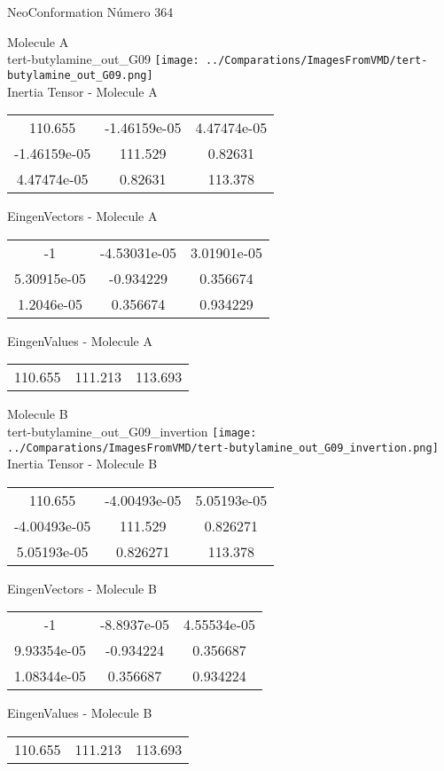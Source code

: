 \vtab[-2cm]
\begin{center}
{\large NeoConformation \tab Número 364}
\end{center}
\begin{multicols}{2}
\begin{center}

Molecule A \\ 
tert-butylamine\_out\_G09
\texttt{[image: ../Comparations/ImagesFromVMD/tert-butylamine\_out\_G09.png]}
\\
Inertia Tensor - Molecule A \\
\vtab

\begin{tabular}{|c c c|}
110.655	 & 	-1.46159e-05	 & 	4.47474e-05	 \\
-1.46159e-05	 & 	111.529	 & 	0.82631	 \\
4.47474e-05	 & 	0.82631	 & 	113.378
\end{tabular}

\vtab
 EingenVectors - Molecule A     \\
\vtab
\begin{tabular}{|c c c|}
-1	 & 	-4.53031e-05	 & 	3.01901e-05	 \\
5.30915e-05	 & 	-0.934229	 & 	0.356674	 \\
1.2046e-05	 & 	0.356674	 & 	0.934229
\end{tabular}

\vtab
 EingenValues - Molecule A     \\
\vtab
\begin{tabular}{|c c c|}
110.655	 & 	111.213	 & 	113.693	 \\
\end{tabular}
\columnbreak

Molecule B \\ 
tert-butylamine\_out\_G09\_invertion
\texttt{[image: ../Comparations/ImagesFromVMD/tert-butylamine\_out\_G09\_invertion.png]}
\\
Inertia Tensor - Molecule B \\
\vtab

\begin{tabular}{|c c c|}
110.655	 & 	-4.00493e-05	 & 	5.05193e-05	 \\
-4.00493e-05	 & 	111.529	 & 	0.826271	 \\
5.05193e-05	 & 	0.826271	 & 	113.378
\end{tabular}

\vtab
 EingenVectors - Molecule B     \\
\vtab
\begin{tabular}{|c c c|}
-1	 & 	-8.8937e-05	 & 	4.55534e-05	 \\
9.93354e-05	 & 	-0.934224	 & 	0.356687	 \\
1.08344e-05	 & 	0.356687	 & 	0.934224
\end{tabular}

\vtab
 EingenValues - Molecule B     \\
\vtab
\begin{tabular}{|c c c|}
110.655	 & 	111.213	 & 	113.693	 \\
\end{tabular}

\end{center}
\end{multicols}
